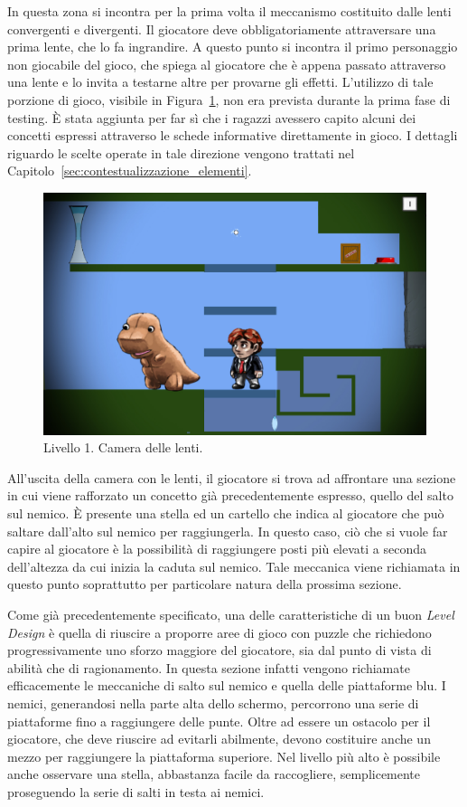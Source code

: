 In questa zona si incontra per la prima volta il meccanismo costituito dalle lenti convergenti e divergenti. Il giocatore deve obbligatoriamente attraversare una prima lente, che lo fa ingrandire. A questo punto si incontra il primo personaggio non giocabile del gioco, che spiega al giocatore che è appena passato attraverso una lente e lo invita a testarne altre per provarne gli effetti. L’utilizzo di tale porzione di gioco, visibile in Figura~\ref{fig:livello1_camera_lenti}, non era prevista durante la prima fase di testing. È stata aggiunta per far sì che i ragazzi avessero capito alcuni dei concetti espressi attraverso le schede informative direttamente in gioco. I dettagli riguardo le scelte operate in tale direzione vengono trattati nel Capitolo~\ref{sec:contestualizzazione_elementi}.

\begin{figure}%
	\centering
	\includegraphics[width= 0.75\columnwidth]{images/gameDesign/46_camera_lenti.jpg}
	\caption{Livello 1. Camera delle lenti.}
	\label{fig:livello1_camera_lenti}
\end{figure}

All’uscita della camera con le lenti, il giocatore si trova ad affrontare una sezione in cui viene rafforzato un concetto già precedentemente espresso, quello del salto sul nemico. È presente una stella ed un cartello che indica al giocatore che può saltare dall’alto sul nemico per raggiungerla. In questo caso, ciò che si vuole far capire al giocatore è la possibilità di raggiungere posti più elevati a seconda dell’altezza da cui inizia la caduta sul nemico.
Tale meccanica viene richiamata in questo punto soprattutto per particolare natura della prossima sezione.

Come già precedentemente specificato, una delle caratteristiche di un buon \textit{Level Design} è quella di riuscire a proporre aree di gioco con puzzle che richiedono progressivamente uno sforzo maggiore del giocatore, sia dal punto di vista di abilità che di ragionamento. In questa sezione infatti vengono richiamate efficacemente le meccaniche di salto sul nemico e quella delle piattaforme blu. I nemici, generandosi nella parte alta dello schermo, percorrono una serie di piattaforme fino a raggiungere delle punte. Oltre ad essere un ostacolo per il giocatore, che deve riuscire ad evitarli abilmente, devono costituire anche un mezzo per raggiungere la piattaforma superiore. Nel livello più alto è possibile anche osservare una stella, abbastanza facile da raccogliere, semplicemente proseguendo la serie di salti in testa ai nemici.

